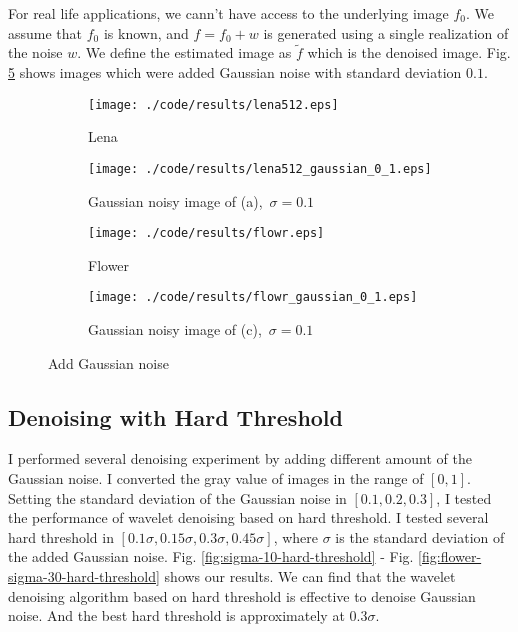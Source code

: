 \documentclass[journal,comsoc]{IEEEtran}
\begin{document}
For real life applications, we cann't have access to the underlying image $f_0$. We assume that $f_0$
is known, and $f=f_0+w$ is generated using a single realization of the noise $w$. We define the estimated image
as $\tilde{f}$ which is the denoised image. Fig. \ref{fig:add-gaussian-noise} shows images which were added
Gaussian noise with standard deviation $0.1$. 
\begin{figure}[!htb]
  \centering
  \begin{subfigure}[t]{.25\textwidth}
    \centering
    \texttt{[image: ./code/results/lena512.eps]}
    \caption{Lena}
    \label{subfig:lena}
  \end{subfigure}%
  \begin{subfigure}[t]{.25\textwidth}
    \centering
    \texttt{[image: ./code/results/lena512\_gaussian\_0\_1.eps]}
    \caption{Gaussian noisy image of (a),\ $\sigma=0.1$}
    \label{subfig:gaussian-noisy-image-of-a}
  \end{subfigure}
  \begin{subfigure}[t]{0.25\textwidth}
    \centering
    \texttt{[image: ./code/results/flowr.eps]}
    \caption{Flower}
    \label{subfig:flower}
  \end{subfigure}%
  \begin{subfigure}[t]{0.25\textwidth}
    \centering
    \texttt{[image: ./code/results/flowr\_gaussian\_0\_1.eps]}
    \caption{Gaussian noisy image of (c),\ $\sigma=0.1$}
    \label{subfig:gaussian-noisy-image-of-c}
  \end{subfigure}
  \caption{Add Gaussian noise}
  \label{fig:add-gaussian-noise}
\end{figure}

\subsection{Denoising with Hard Threshold}
\label{subsec:denoising-with-hard-thresholding}

I performed several denoising experiment by adding different amount of the Gaussian
noise. I converted the gray value of images in the range of $[0,1]$. Setting the
standard deviation of the Gaussian noise in $[0.1,0.2,0.3]$, I tested the performance of
wavelet denoising based on hard threshold. 
I tested several hard threshold in $[0.1\sigma,0.15\sigma,0.3\sigma,0.45\sigma]$,
where $\sigma$ is the standard deviation of the added Gaussian noise.
Fig. \ref{fig:sigma-10-hard-threshold} - Fig. \ref{fig:flower-sigma-30-hard-threshold} shows our results.
We can find that the wavelet denoising algorithm based on hard threshold is effective to
denoise Gaussian noise. And the best hard threshold is approximately at $0.3\sigma$.
\end{document}
